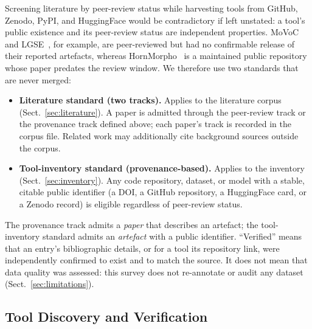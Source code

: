 \documentclass[runningheads]{llncs}
\begin{document}
Screening literature by peer-review status while harvesting tools from GitHub, Zenodo, PyPI, and HuggingFace would be contradictory if left unstated: a tool's public existence and its peer-review status are independent properties. MoVoC~\cite{teklehaymanot_movoc_2025} and LGSE~\cite{teklehaymanot_lgse_2026}, for example, are peer-reviewed but had no confirmable release of their reported artefacts, whereas HornMorpho~\cite{gasser_hornmorpho_2011} is a maintained public repository whose paper predates the review window. We therefore use two standards that are never merged:
\begin{itemize}
  \item \textbf{Literature standard (two tracks).} Applies to the literature corpus (Sect.~\ref{sec:literature}). A paper is admitted through the peer-review track or the provenance track defined above; each paper's track is recorded in the corpus file. Related work may additionally cite background sources outside the corpus.
  \item \textbf{Tool-inventory standard (provenance-based).} Applies to the inventory (Sect.~\ref{sec:inventory}). Any code repository, dataset, or model with a stable, citable public identifier (a DOI, a GitHub repository, a HuggingFace card, or a Zenodo record) is eligible regardless of peer-review status.
\end{itemize}
The provenance track admits a \emph{paper} that describes an artefact; the tool-inventory standard admits an \emph{artefact} with a public identifier. ``Verified'' means that an entry's bibliographic details, or for a tool its repository link, were independently confirmed to exist and to match the source. It does not mean that data quality was assessed: this survey does not re-annotate or audit any dataset (Sect.~\ref{sec:limitations}).

\subsection{Tool Discovery and Verification}\label{sec:tool-discovery}
\end{document}
